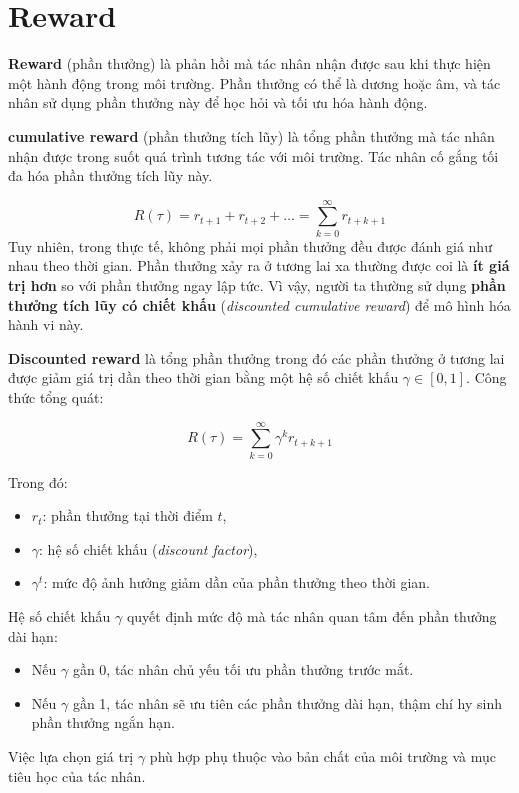 \documentclass[final,letterpaper,twoside,12pt]{report}
\begin{document}
\section{Reward}

\textbf{Reward} (phần thưởng) là phản hồi mà tác nhân nhận được sau khi thực hiện một hành động trong môi trường. Phần thưởng có thể là dương hoặc âm, và tác nhân sử dụng phần thưởng này để học hỏi và tối ưu hóa hành động.

\textbf{cumulative reward} (phần thưởng tích lũy) là tổng phần thưởng mà tác nhân nhận được trong suốt quá trình tương tác với môi trường. Tác nhân cố gắng tối đa hóa phần thưởng tích lũy này.

\[
	R(\tau)  =  r_{t+1} + r_{t+ 2} + \dots = \sum_{k=0}^{\infty} r_{t+k+1}
\]
Tuy nhiên, trong thực tế, không phải mọi phần thưởng đều được đánh giá như nhau theo thời gian. Phần thưởng xảy ra ở tương lai xa thường được coi là \textbf{ít giá trị hơn} so với phần thưởng ngay lập tức. Vì vậy, người ta thường sử dụng \textbf{phần thưởng tích lũy có chiết khấu} (\textit{discounted cumulative reward}) để mô hình hóa hành vi này.

\textbf{Discounted reward} là tổng phần thưởng trong đó các phần thưởng ở tương lai được giảm giá trị dần theo thời gian bằng một hệ số chiết khấu \( \gamma \in [0, 1] \). Công thức tổng quát:

\[
	R(\tau) = \sum_{k=0}^{\infty} \gamma^k r_{t+k+1}
\]

Trong đó:
\begin{itemize}
	\item \( r_t \): phần thưởng tại thời điểm \( t \),
	\item \( \gamma \): hệ số chiết khấu (\textit{discount factor}),
	\item \( \gamma^t \): mức độ ảnh hưởng giảm dần của phần thưởng theo thời gian.
\end{itemize}

Hệ số chiết khấu \( \gamma \) quyết định mức độ mà tác nhân quan tâm đến phần thưởng dài hạn:
\begin{itemize}
	\item Nếu \( \gamma \) gần 0, tác nhân chủ yếu tối ưu phần thưởng trước mắt.
	\item Nếu \( \gamma \) gần 1, tác nhân sẽ ưu tiên các phần thưởng dài hạn, thậm chí hy sinh phần thưởng ngắn hạn.
\end{itemize}

Việc lựa chọn giá trị \( \gamma \) phù hợp phụ thuộc vào bản chất của môi trường và mục tiêu học của tác nhân.
\end{document}
